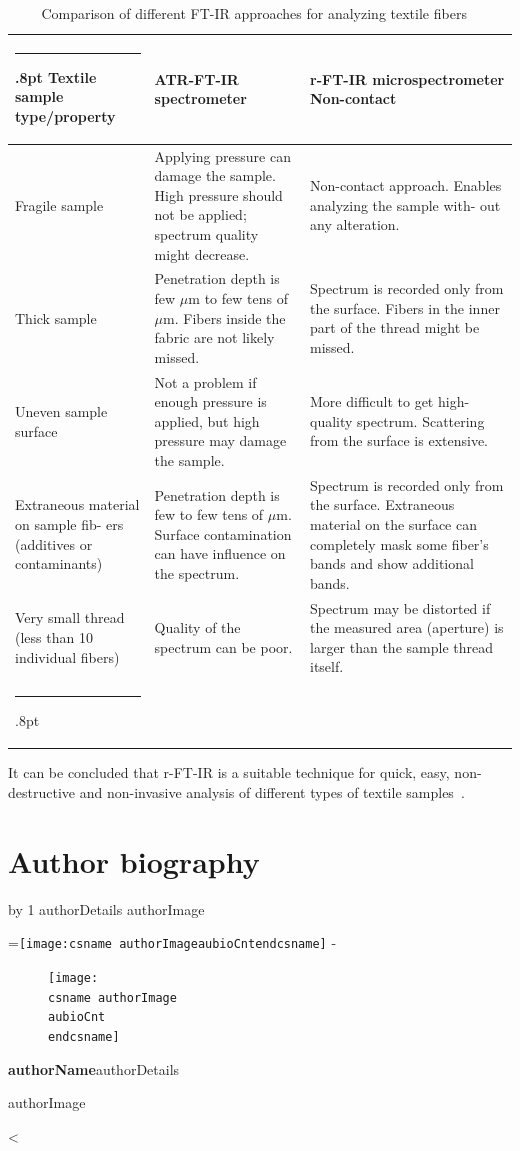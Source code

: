 \documentclass[11pt]{article}
\makeatletter
\newcounter{aubio}
\newcommand{\checkheight}[1]{%
  \par \penalty-100\begingroup%
  \setbox8=\hbox{#1}%
  \setlength{\dimen@}{\ht8}%
  \dimen@ii\pagegoal \advance\dimen@ii-\pagetotal
  \ifdim \dimen@>\dimen@ii
    \break
  \fi\endgroup}
\def\printBio{%
  \@tempcnta=0
   \loop
     \advance \@tempcnta by 1
     \def\aubioCnt{\the\@tempcnta}
     \setlength{\intextsep}{0pt}%
     \setlength{\columnsep}{10pt}%
     \newbox\boxa%
     \setbox\boxa\vbox{\csname authorDetails\aubioCnt\endcsname}
     \expandafter\ifx\csname authorImage\aubioCnt\endcsname\relax%
      \else%
       \checkheight{\texttt{[image: \\csname authorImage\\aubioCnt\\endcsname]}}
        \begin{figure}
         \texttt{[image: \\csname authorImage\\aubioCnt\\endcsname]}%
        \end{figure}\par
      \fi
     {\parindent0pt\textbf{\csname authorName\aubioCnt\endcsname}\csname authorDetails\aubioCnt\endcsname \par\bigskip%
     \expandafter\ifx\csname authorImage\aubioCnt\endcsname\relax\else%
      \ifdim\the\ht\boxa < 90pt\vskip\dimexpr(90pt -\the\ht\boxa-1pc)\fi%
     \fi}%
      \ifnum\@tempcnta < \theaubio
   \repeat
   }
\def\hlinewd#1{%
  \noalign{\ifnum0=`}\fi\hrule \@height #1%
  \futurelet\reserved@a\@xhline}
\def\tbltoprule{\hlinewd{.8pt}}%
\def\tblbottomrule{\hlinewd{.8pt}}
\def\tblmidrule{\hline\noalign{\vspace*{2pt}}}
\makeatother
\begin{document}
\begin{table}[!htbp]
\caption{{Comparison of different FT-IR approaches for analyzing textile fibers \unskip~\protect\cite{693772:16533873}} }
\label{tw-524706f5cbef}
\def\arraystretch{1}
\ignorespaces 
\centering 
\begin{tabulary}{\linewidth}{LLL}
\tbltoprule Textile sample type/property & ATR-FT-IR spectrometer & r-FT-IR microspectrometer Non-contact\\
\tblmidrule 
Fragile sample &
  Applying pressure can damage the sample. High pressure should not be applied; spectrum quality might decrease. &
  Non-contact approach. \mbox{}\protect\newline Enables analyzing the sample with- out any alteration.\\
Thick sample &
  Penetration depth is few \ensuremath{\mu }m to few tens of \ensuremath{\mu }m. Fibers inside the fabric are not likely missed. &
  Spectrum is recorded only from the surface. Fibers in the inner part of the thread might be missed.\\
Uneven sample surface &
  Not a problem if enough pressure is applied, but high pressure may damage the sample. &
  More difficult to get high-quality spectrum. Scattering from the surface is extensive.\\
Extraneous material on sample fib- ers (additives or contaminants) &
  Penetration depth is few to few tens of \ensuremath{\mu }m. Surface contamination can have influence on the spectrum. &
  Spectrum is recorded only from the surface. Extraneous material on the surface \mbox{}\protect\newline can completely mask some fiber's bands and show additional bands.\\
Very small thread (less than 10 individual fibers) &
  Quality of the spectrum can be poor. &
  Spectrum may be distorted if the measured area (aperture) is larger than the sample thread itself.\\
\tblbottomrule 
\end{tabulary}\par 
\end{table}
It can be concluded that r-FT-IR is a suitable technique for quick, easy, non-destructive and non-invasive analysis of different types of textile samples\unskip~\cite{693772:16533873}.

\clearpage 
    





\section*{Author biography}

\printBio 
\end{document}
